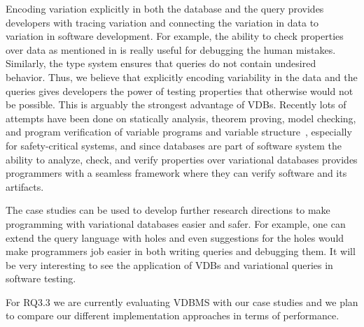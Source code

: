  
%
%
Encoding variation explicitly in both the database and the query
provides developers with tracing variation and connecting
the variation in data to variation in software development.
For example,
the ability to check properties over data as mentioned in
 is really useful for debugging the
human mistakes. Similarly, the type system ensures that 
queries do not contain undesired behavior. 
%
Thus, we believe that explicitly
encoding variability in the data and the queries gives developers the 
power of testing properties that otherwise would not be possible. 
This is arguably the strongest advantage of VDBs. Recently
lots of attempts have been done
on statically analysis, theorem proving, model checking, and program verification
of variable programs and 
variable structure~\cite{brkts20vamos, bks11fvoos, ldl07jss, tmbhvs14}, especially 
for safety-critical systems,
 and since databases are part of 
software system the ability to analyze, check, and verify 
properties over variational databases provides programmers
with a seamless framework where they can verify software
and its artifacts.
%


The case studies can be used to develop further research directions
to make programming with variational databases easier and safer.
%
%
For example, one can extend the query language with holes and even suggestions for 
the holes would make programmers job easier in both writing queries
and debugging them.
%
It will be very interesting to see the application of VDBs and 
variational queries in software testing.

For RQ3.3 we are currently evaluating VDBMS with our case studies and we plan
to compare our different implementation approaches in terms of performance.
 
%
%
%
%